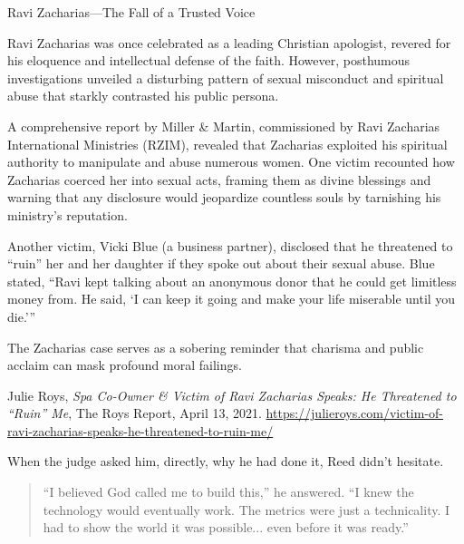 \begin{HistoricalSidebar}{Ravi Zacharias—The Fall of a Trusted Voice}

Ravi Zacharias was once celebrated as a leading Christian apologist, revered for his eloquence and intellectual defense of the faith. However, posthumous investigations unveiled a disturbing pattern of sexual misconduct and spiritual abuse that starkly contrasted his public persona.

\medskip

A comprehensive report by Miller \& Martin, commissioned by Ravi Zacharias International Ministries (RZIM), revealed that Zacharias exploited his spiritual authority to manipulate and abuse numerous women. One victim recounted how Zacharias coerced her into sexual acts, framing them as divine blessings and warning that any disclosure would jeopardize countless souls by tarnishing his ministry's reputation.

\medskip

Another victim, Vicki Blue (a business partner), disclosed that he threatened to ``ruin'' her and her daughter if they spoke out about their sexual abuse. Blue stated, “Ravi kept talking about an anonymous donor that he could get limitless money from. He said, ‘I can keep it going and make your life miserable until you die.’” \cite{blue2021}

\medskip

The Zacharias case serves as a sobering reminder that charisma and public acclaim can mask profound moral failings.

\begin{thebibliography}{9}
Julie Roys, \textit{Spa Co-Owner \& Victim of Ravi Zacharias Speaks: He Threatened to “Ruin” Me}, The Roys Report, April 13, 2021. \url{https://julieroys.com/victim-of-ravi-zacharias-speaks-he-threatened-to-ruin-me/}
\end{thebibliography}
\end{HistoricalSidebar}

\medskip


When the judge asked him, directly, why he had done it, Reed didn’t hesitate.

\begin{quote}
“I believed God called me to build this,” he answered.  
“I knew the technology would eventually work.  
The metrics were just a technicality.  
I had to show the world it was possible... even before it was ready.”  
\end{quote}

